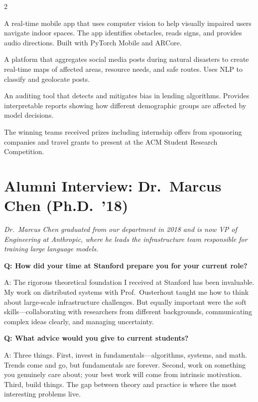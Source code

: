 \documentclass[10pt,a4paper]{article}
\begin{document}
\begin{multicols}{2}
\begin{description}[leftmargin=0em, style=nextline, itemsep=4pt]
  \item[1st Place -- ``AccessiVision'' (Team Alpha)]
  A real-time mobile app that uses computer vision to help visually impaired users navigate indoor spaces. The app identifies obstacles, reads signs, and provides audio directions. Built with PyTorch Mobile and ARCore.

  \item[2nd Place -- ``CrisisMap'' (Team Resilience)]
  A platform that aggregates social media posts during natural disasters to create real-time maps of affected areas, resource needs, and safe routes. Uses NLP to classify and geolocate posts.

  \item[3rd Place -- ``FairLend'' (Team Justice)]
  An auditing tool that detects and mitigates bias in lending algorithms. Provides interpretable reports showing how different demographic groups are affected by model decisions.
\end{description}

The winning teams received prizes including internship offers from sponsoring companies and travel grants to present at the ACM Student Research Competition.

\columnbreak

\section{Alumni Interview: Dr.\ Marcus Chen (Ph.D.\ '18)}

\textit{Dr.\ Marcus Chen graduated from our department in 2018 and is now VP of Engineering at Anthropic, where he leads the infrastructure team responsible for training large language models.}

\textbf{Q: How did your time at Stanford prepare you for your current role?}

A: The rigorous theoretical foundation I received at Stanford has been invaluable. My work on distributed systems with Prof.\ Ousterhout taught me how to think about large-scale infrastructure challenges. But equally important were the soft skills---collaborating with researchers from different backgrounds, communicating complex ideas clearly, and managing uncertainty.

\textbf{Q: What advice would you give to current students?}

A: Three things. First, invest in fundamentals---algorithms, systems, and math. Trends come and go, but fundamentals are forever. Second, work on something you genuinely care about; your best work will come from intrinsic motivation. Third, build things. The gap between theory and practice is where the most interesting problems live.


\end{multicols}
\end{document}
